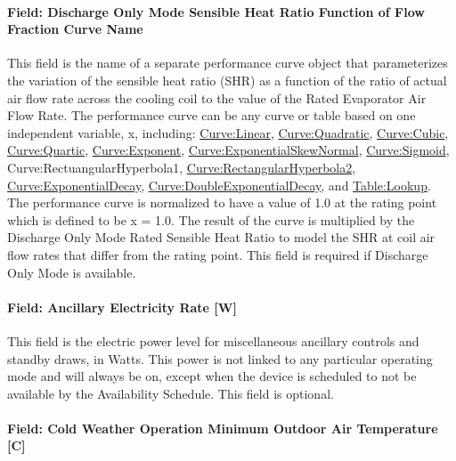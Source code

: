 \paragraph{Field: Discharge Only Mode Sensible Heat Ratio Function of Flow Fraction Curve Name}\label{field-discharge-only-mode-sensible-heat-ratio-function-of-flow-fraction-curve-name}

This field is the name of a separate performance curve object that parameterizes the variation of the sensible heat ratio (SHR) as a function of the ratio of actual air flow rate across the cooling coil to the value of the Rated Evaporator Air Flow Rate. The performance curve can be any curve or table based on one independent variable, x, including: \hyperref[curvelinear]{Curve:Linear}, \hyperref[curvequadratic]{Curve:Quadratic}, \hyperref[curvecubic]{Curve:Cubic}, \hyperref[curvequartic]{Curve:Quartic}, \hyperref[curveexponent]{Curve:Exponent}, \hyperref[curveexponentialskewnormal]{Curve:ExponentialSkewNormal}, \hyperref[curvesigmoid]{Curve:Sigmoid}, Curve:RectuangularHyperbola1, \hyperref[curverectangularhyperbola2]{Curve:RectangularHyperbola2}, \hyperref[curveexponentialdecay]{Curve:ExponentialDecay}, \hyperref[curvedoubleexponentialdecay]{Curve:DoubleExponentialDecay}, and \hyperref[tablelookup]{Table:Lookup}. The performance curve is normalized to have a value of 1.0 at the rating point which is defined to be x = 1.0. The result of the curve is multiplied by the Discharge Only Mode Rated Sensible Heat Ratio to model the SHR at coil air flow rates that differ from the rating point. This field is required if Discharge Only Mode is available.

\paragraph{Field: Ancillary Electricity Rate {[}W{]}}\label{field-ancillary-electric-power-w}

This field is the electric power level for miscellaneous ancillary controls and standby draws, in Watts. This power is not linked to any particular operating mode and will always be on, except when the device is scheduled to not be available by the Availability Schedule. This field is optional.

\paragraph{Field: Cold Weather Operation Minimum Outdoor Air Temperature {[}C{]}}\label{field-cold-weather-operation-minimum-outdoor-air-temperature-c}

